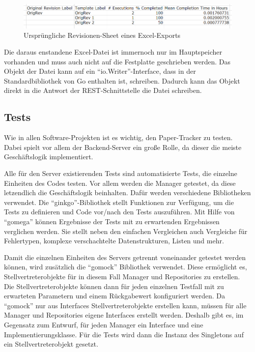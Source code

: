 \begin{figure}[htbp]
	\includegraphics[width=\textwidth]{images/export_orig_revisions.png}
	\centering
	\caption{Ursprüngliche Revisionen-Sheet eines Excel-Exports}
	\label{fig:export-orig-revisions}
\end{figure}

Die daraus enstandene Excel-Datei ist immernoch nur im Hauptspeicher vorhanden
und muss auch nicht auf die Festplatte geschrieben werden.
Das Objekt der Datei kann auf ein \enquote{io.Writer}-Interface,
dass in der Standardbibliothek von Go enthalten ist, schreiben.
Dadurch kann das Objekt direkt in die Antwort der \gls{REST}-Schnittstelle die Datei schreiben.

\subsection{Tests}

Wie in allen Software-Projekten ist es wichtig, den Paper-Tracker zu testen.
Dabei spielt vor allem der Backend-Server ein große Rolle, da dieser die meiste Geschäftslogik implementiert.

Alle für den Server existierenden Tests sind automatisierte Tests, die einzelne Einheiten des Codes testen.
Vor allem werden die Manager getestet, da diese letzendlich die Geschäftslogik beinhalten.
Dafür werden verschiedene Bibliotheken verwendet.
Die \enquote{ginkgo}-Bibliothek stellt Funktionen zur Verfügung, um die Tests zu definieren
und Code vor/nach den Tests auszuführen.
Mit Hilfe von \enquote{gomega} können Ergebnisse der Tests mit zu erwartenden Ergebnissen verglichen werden.
Sie stellt neben den einfachen Vergleichen auch Vergleiche für Fehlertypen, komplexe verschachtelte Datenstrukturen,
Listen und mehr.

Damit die einzelnen Einheiten des Servers getrennt voneinander getestet werden können, wird zusätzlich die
\enquote{gomock} Bibliothek verwendet.
Diese ermöglicht es, Stellvertreterobjekte für in diesem Fall Manager und Repositories zu erstellen.
Die Stellvertreterobjekte können dann für jeden einzelnen Testfall mit zu erwarteten Parametern und einem Rückgabewert
konfiguriert werden.
Da \enquote{gomock} nur aus Interfaces Stellvertreterobjekte erstellen kann, müssen für alle Manager
und Repositories eigene Interfaces erstellt werden.
Deshalb gibt es, im Gegensatz zum Entwurf, für jeden Manager ein Interface und eine Implementierungsklasse.
Für die Tests wird dann die Instanz des Singletons auf ein Stellvertreterobjekt gesetzt.

